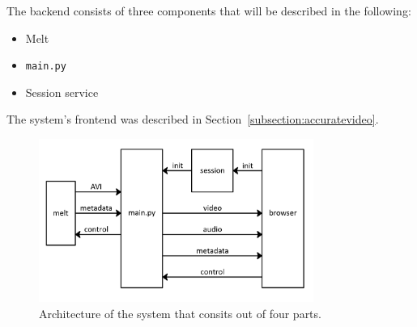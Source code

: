 \documentclass[../MasterThesis.tex]{subfiles}
\begin{document}
%
%

The backend consists of three components that will be described in the following:
\begin{itemize}
	\item Melt
	\item \texttt{main.py}
	\item Session service
\end{itemize}

The system's frontend was described in Section~\ref{subsection:accuratevideo}.

\begin{figure}[H]
	\centering
	\includegraphics[width=0.8\textwidth]{IM3.png}
	\caption[System architecture]{Architecture of the system that consits out of four parts.}
\end{figure}

%
%
%
\end{document}
